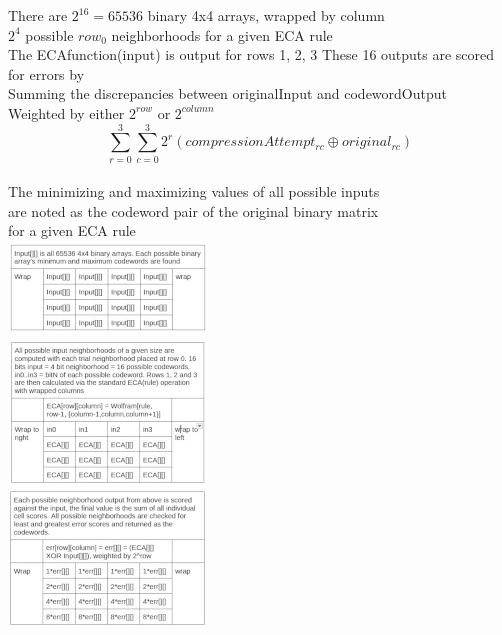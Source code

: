 \documentclass[11pt]{article}
\begin{document}
\begin{center}
There are $2^{16}=65536$ binary 4x4 arrays, wrapped by column\\
$2^4$ possible $row_0$ neighborhoods for a given ECA rule\\
The ECAfunction(input) is output for rows 1, 2, 3
These 16 outputs are scored for errors by\\
Summing the discrepancies between originalInput and codewordOutput\\
Weighted by either $2^{row}$ or $2^{column}$\\
\[  \sum_{r=0}^{3} \sum_{c=0}^{3} 2^r ( compressionAttempt_{r c} \oplus original_{r c}) \]\\
 The minimizing and maximizing values of all possible inputs\\
 are noted as the codeword pair of the original binary matrix\\
 for a given ECA rule\\
\includegraphics{inputGrid}\\
\includegraphics{ecaGrid}\\
\includegraphics{errorGrid}\\
\end{center}
\end{document}
